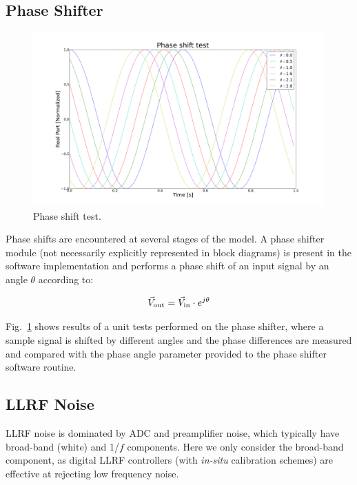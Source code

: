 \documentclass[a4paper,12pt]{article}
\begin{document}
\subsection{Phase Shifter}

\begin{figure}
\centering
\includegraphics[scale=0.265]{../figures/phase_shift_test.png}
\caption{Phase shift test.}
\label{fig:phase_shfiter_test}
\end{figure}

Phase shifts are encountered at several stages of the model. A phase shifter module (not necessarily explicitly represented in block diagrams) is present in the software implementation and performs a phase shift of an input signal by an angle $\theta$ according to:

\begin{equation}
  \vec V_{\rm out} = \vec V_{\rm in} \cdot e^{j\theta}
\end{equation}

Fig.~\ref{fig:phase_shfiter_test} shows results of a unit tests performed on the phase shifter, where a sample signal is shifted by different angles and the phase differences are measured and compared with the phase angle parameter provided to the phase shifter software routine.

\subsection{LLRF Noise}

LLRF noise is dominated by ADC and preamplifier noise, which typically have broad-band (white) and 1/$f$ components. Here we only consider the broad-band component, as digital LLRF controllers (with {\it in-situ} calibration schemes) are effective at rejecting low frequency noise.
\end{document}
